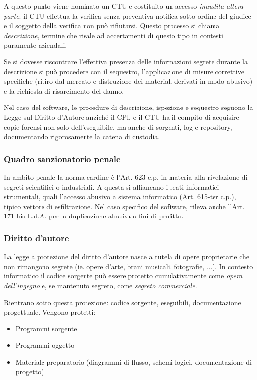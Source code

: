 \documentclass[11pt,a4paper]{article}
\begin{document}
A questo punto viene nominato un CTU e costituito un accesso \textit{inaudita altera  parte}: il CTU effettua la verifica senza preventiva notifica sotto ordine del giudice e il soggetto della verifica non può rifiutarsi. Questo processo si chiama \textit{descrizione}, termine che risale ad accertamenti di questo tipo in contesti puramente aziendali.

Se si dovesse riscontrare l'effettiva presenza delle informazioni segrete durante la descrizione si può procedere con il sequestro, l'applicazione di misure correttive specifiche (ritiro dal mercato e distruzione dei materiali derivati in modo abusivo) e la richiesta di risarcimento del danno. 

Nel caso del software, le procedure di descrizione, ispezione e sequestro seguono la Legge sul Diritto d'Autore anziché il CPI, e il CTU ha il compito di acquisire copie forensi non solo dell'eseguibile, ma anche di sorgenti, log e repository, documentando rigorosamente la catena di custodia.

\subsubsection{Quadro sanzionatorio penale}
In ambito penale la norma cardine è l'Art. 623 c.p. in materia alla rivelazione di segreti scientifici o industriali. A questa si affiancano i reati informatici strumentali, quali l'accesso abusivo a sistema informatico (Art. 615-ter c.p.), tipico vettore di esfiltrazione. Nel caso specifico del software, rileva anche l'Art. 171-bis L.d.A. per la duplicazione abusiva a fini di profitto.

\subsubsection{Diritto d'autore}
La legge a protezione del diritto d'autore nasce a tutela di opere proprietarie che non rimangono segrete (ie. opere d'arte, brani musicali, fotografie, ...).
In contesto informatico il codice sorgente può essere protetto cumulativamente come \textit{opera dell'ingegno} e, se mantenuto segreto, come \textit{segreto commerciale}.

Rientrano sotto questa protezione:  codice sorgente, eseguibili, documentazione progettuale.
Vengono protetti:
\begin{itemize}
    \item Programmi sorgente
    \item Programmi oggetto
    \item Materiale preparatorio (diagrammi di flusso, schemi logici, documentazione di progetto)
\end{itemize}
\end{document}
